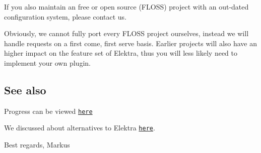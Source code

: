 If you also maintain an free or open source (F\+L\+O\+SS) project with an out-\/dated configuration system, please contact us.

Obviously, we cannot fully port every F\+L\+O\+SS project ourselves, instead we will handle requests on a first come, first serve basis. Earlier projects will also have an higher impact on the feature set of Elektra, thus you will less likely need to implement your own plugin.

\subsection*{See also}


\begin{DoxyItemize}
\item Progress can be viewed \href{https://git.libelektra.org/projects/7}{\tt here}
\item We discussed about alternatives to Elektra \href{https://issues.libelektra.org/1266}{\tt here}.
\end{DoxyItemize}

Best regards, Markus 